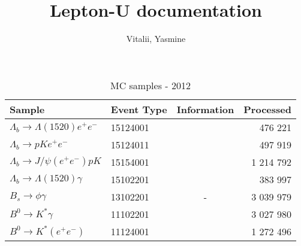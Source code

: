 \documentclass[11pt, oneside]{article}   	%
\title{Lepton-U documentation}
\author{Vitalii, Yasmine}
\begin{document}
\maketitle





\begin{table}[h]
\centering
\begin{tabular}{llcr}
Sample& Event Type  & Information & Processed \\

\hline
$\Lambda_b\to \Lambda(1520) e^+e^-$ & 15124001 & & 476 221 \\
$\Lambda_b\to pK e^+e^-$&15124011  & & 497 919 \\
$\Lambda_b\to J/\psi (e^+e^-)pK $&15154001  & & 1 214 792\\
$\Lambda_b\to \Lambda(1520) \gamma $ &15102201 & &383 997 \\
\hline 
$ B_s\to \phi \gamma$& 13102201 & - &   3 039 979\\

$B^0 \to K^* \gamma $ &11102201 & & 3 027 980\\

$ B^0 \to K^* (e^+e^-)$ &  11124001& &  1 272 496\\
\end{tabular}
\caption {MC samples - 2012 }
\end{table}
\end{document}
